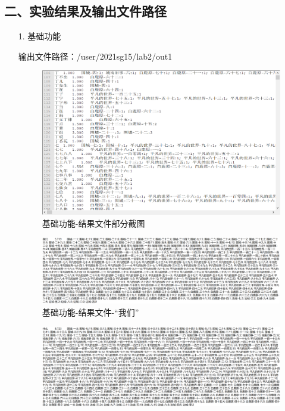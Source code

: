 \documentclass[a4paper,UTF8]{article}
\theoremstyle{definition}
\begin{document}
\begin{CJK}{UTF8}{gkai}
\begin{CJK*}{UTF8}{gbsn}
\section*{二、实验结果及输出文件路径}
\end{CJK*}
\begin{enumerate}
	\item[1.] 基础功能
	\par 输出文件路径：/user/2021sg15/lab2/out1
	\begin{figure}[H]
	    \centering
	    \includegraphics[scale=0.6]{./img/InvertedIndex_res.png}
	    \caption{基础功能-结果文件部分截图}
	\end{figure} 
	\begin{figure}[H]
	    \centering
	    \includegraphics[scale=0.4]{./img/InvertedIndex_we.png}
	    \caption{基础功能-结果文件-“我们”}
	\end{figure} 
	\begin{figure}[H]
	    \centering
	    \includegraphics[scale=0.4]{./img/InvertedIndex_what.png}

\end{figure}
\end{enumerate}
\end{CJK}
\end{document}
